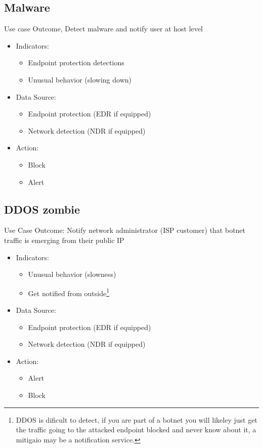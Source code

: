 \documentclass[
	letterpaper, %
	10pt, %
	unnumberedsections, %
	twoside, %
]{APAAssignment}
\begin{document}
\subsection{Malware}
Use case Outcome, Detect malware and notify user at host level
\begin{spacing}{1}
	\begin{itemize}
		\item Indicators:
		      \begin{itemize}
			      \item Endpoint protection detections
			      \item Unusual behavior (slowing down)
		      \end{itemize}
		\item Data Source:
		      \begin{itemize}
			      \item Endpoint protection (EDR if equipped)
			      \item Network detection (NDR if equipped)
		      \end{itemize}
		\item Action:
		      \begin{itemize}
			      \item Block
			      \item Alert
		      \end{itemize}
	\end{itemize}
\end{spacing}

\subsection{DDOS zombie} Use Case Outcome: Notify network administrator (ISP customer) that botnet traffic is emerging from their public IP

\begin{spacing}{1}
	\begin{itemize}
		\item Indicators:
		      \begin{itemize}
			      \item Unusual behavior (slowness)
			      \item Get notified from outside\footnote{DDOS is dificult to detect, if you are part of a botnet you will likeley just get the traffic going to the attacked endpoint blocked and never know about it, a mitigaio may be a notification service.}
		      \end{itemize}
		\item Data Source:
		      \begin{itemize}
			      \item Endpoint protection (EDR if equipped)
			      \item Network detection (NDR if equipped)
		      \end{itemize}
		\item Action:
		      \begin{itemize}
			      \item Alert
			      \item Block
		      \end{itemize}
	\end{itemize}
\end{spacing}
\end{document}
